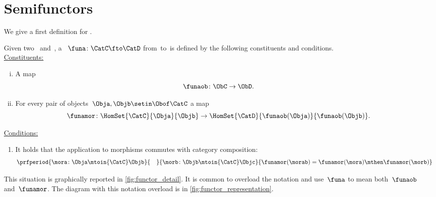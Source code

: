 
\section{Semifunctors}

We give a first definition for .


\begin{ctdefinition}[Semifunctor]
    \label{def:semi-functor}
    Given two ~\CatC and~\CatD, a ~$\funa\colon \CatC\fto \CatD$ from~\CatC to~\CatD is defined by the following constituents and conditions.
    \\
    \underline{Constituents:}
    \begin{enumerate}
        [i)]
        \item A map
              \begin{equation}
                  \funaob \colon \ObC \to \ObD.
              \end{equation}
        \item For every pair of objects~$\Obja, \Objb\setin \Obof\CatC$ a map
              \begin{equation}
                  \funamor\colon \HomSet{\CatC}{\Obja}{\Objb} \to \HomSet{\CatD}{\funaob(\Obja)}{\funaob(\Objb)}.
              \end{equation}
    \end{enumerate}
    \underline{Conditions:}
    \begin{enumerate}
        \item It holds that the  application to morphisms commutes with category composition:
              \begin{equation}
                  \prfperiod{
                      \mora\colon \Obja \mtoin{\CatC} \Objb
                  }{\quad}{
                      \morb\colon \Objb \mtoin{\CatC} \Objc
                  }{
                      \funamor(\morab)=\funamor(\mora)\mthen \funamor(\morb)
                  }
              \end{equation}
    \end{enumerate}
\end{ctdefinition}

This situation is graphically reported in \cref{fig:functor_detail}.
%
It is common to overload the notation and use~$\funa$ to mean both~$\funaob$ and~$\funamor$.
The diagram with this notation overload is in \cref{fig:functor_representation}.

